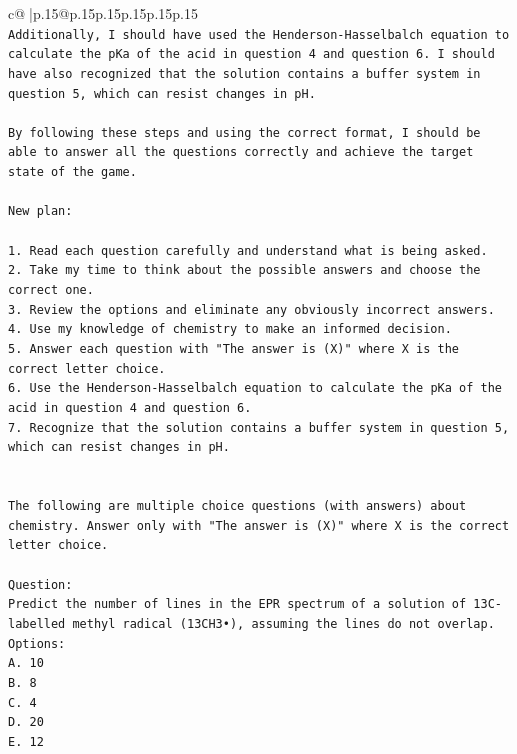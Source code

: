 \documentclass{article}
\begin{document}
{\begin{supertabular}{c@{$\;$}|p{.15\linewidth}@{}p{.15\linewidth}p{.15\linewidth}p{.15\linewidth}p{.15\linewidth}p{.15\linewidth}}
{{{\\ 
\texttt{Additionally, I should have used the Henderson{-}Hasselbalch equation to calculate the pKa of the acid in question 4 and question 6. I should have also recognized that the solution contains a buffer system in question 5, which can resist changes in pH.} \\
\\ 
\texttt{By following these steps and using the correct format, I should be able to answer all the questions correctly and achieve the target state of the game.} \\
\\ 
\texttt{New plan: } \\
\\ 
\texttt{1. Read each question carefully and understand what is being asked.} \\
\texttt{2. Take my time to think about the possible answers and choose the correct one.} \\
\texttt{3. Review the options and eliminate any obviously incorrect answers.} \\
\texttt{4. Use my knowledge of chemistry to make an informed decision.} \\
\texttt{5. Answer each question with "The answer is (X)" where X is the correct letter choice.} \\
\texttt{6. Use the Henderson{-}Hasselbalch equation to calculate the pKa of the acid in question 4 and question 6.} \\
\texttt{7. Recognize that the solution contains a buffer system in question 5, which can resist changes in pH.} \\
\\ 
\\ 
\texttt{The following are multiple choice questions (with answers) about chemistry. Answer only with "The answer is (X)" where X is the correct letter choice.} \\
\\ 
\texttt{Question:} \\
\texttt{Predict the number of lines in the EPR spectrum of a solution of 13C{-}labelled methyl radical (13CH3•), assuming the lines do not overlap.} \\
\texttt{Options:} \\
\texttt{A. 10} \\
\texttt{B. 8} \\
\texttt{C. 4} \\
\texttt{D. 20} \\
\texttt{E. 12} \\
}}}
\end{supertabular}}
\end{document}
